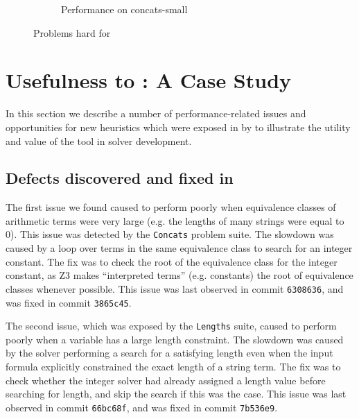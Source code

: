 \begin{figure}[h]
\begin{subfigure}{.5\textwidth}
            \label{fig:concats-small}
            \vspace{-0.25in}
            \caption{Performance on concats-small}
        \end{subfigure}
        \vspace{-0.1in}
        \caption{Problems hard for \us{}}
        \label{fig:z3str3-hard}
        \vspace{-0.3in}
    \end{figure}

    
\section{Usefulness to \us{}: A Case Study}
\label{sec:analysis}

        In this section we describe a number of performance-related issues and opportunities for new heuristics
        which were exposed in \us{} by \fuzzer{} to illustrate the utility and value of the tool in solver development.
        
        
\subsection{Defects discovered and fixed in \us{}}


The first issue we found caused \us{} to perform poorly when equivalence classes 
of arithmetic terms were very large (e.g. the lengths of many strings were equal
to 0). This issue was detected by the \texttt{Concats} problem suite. The slowdown 
was caused by a loop over terms in the same equivalence class to search for an 
integer constant. The fix was to check the root of the equivalence class for the 
integer constant, as Z3 makes ``interpreted terms'' (e.g. constants) the root of 
equivalence classes whenever possible. This issue was last observed in commit 
\texttt{6308636}, and was fixed in commit \texttt{3865c45}.


The second issue, which was exposed by the \texttt{Lengths} suite, caused \us{} to 
perform poorly when a variable has a large length constraint.
The slowdown was caused by the solver performing a search for a satisfying length
even when the input formula explicitly constrained the exact length of a string term.
The fix was to check whether the integer solver had already assigned a length value
before searching for length, and skip the search if this was the case.
This issue was last observed in commit \texttt{66bc68f}, and was fixed in commit 
\texttt{7b536e9}.    
    
